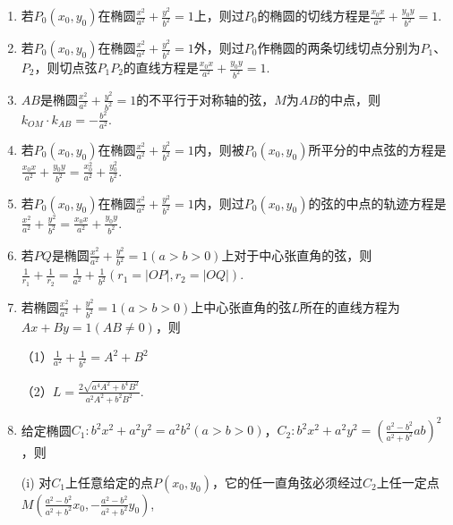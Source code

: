 \documentclass{article}
\begin{document}
\begin{enumerate}[label=\arabic*.]
\item 若$P_0\left(x_0,y_0\right)$在椭圆$\displaystyle\frac{x^2}{a^2} + \frac{y^2}{b^2} = 1$上，则过$P_0$的椭圆的切线方程是$\frac{x_0x}{a^2} + \frac{y_0y}{b^2} = 1$.

\item 若$P_0\left(x_0,y_0\right)$在椭圆$\displaystyle\frac{x^2}{a^2} + \frac{y^2}{b^2} = 1$外，则过$P_0$作椭圆的两条切线切点分别为$P_1$、$P_2$，则切点弦$P_1P_2$的直线方程是$\displaystyle\frac{x_0x}{a^2} + \frac{y_0y}{b^2} = 1$.

\item $AB$是椭圆$\displaystyle\frac{x^2}{a^2} + \frac{y^2}{b^2} = 1 $的不平行于对称轴的弦，$M$为$AB$的中点，则$k_{OM} \cdot k_{AB} = -\frac{b^2}{a^2}$. 

\item 若$P_0\left(x_0,y_0\right)$在椭圆$\displaystyle\frac{x^2}{a^2} + \frac{y^2}{b^2} = 1$内，则被$P_0\left(x_0,y_0\right)$所平分的中点弦的方程是$\frac{x_0x}{a^2} + \frac{y_0y}{b^2} = \frac{x_0^2}{a^2} + \frac{y_0^2}{b^2}$.

\item 若$P_0\left(x_0,y_0\right)$在椭圆$\displaystyle\frac{x^2}{a^2} + \frac{y^2}{b^2} = 1$内，则过$P_0\left(x_0,y_0\right)$的弦的中点的轨迹方程是$\frac{x^2}{a^2} + \frac{y^2}{b^2} = \frac{x_0x}{a^2} + \frac{y_0y}{b^2}$.

\item 若$PQ$是椭圆$\frac{x^2}{a^2} + \frac{y^2}{b^2} = 1 \left(a > b > 0\right)$上对于中心张直角的弦，则$\frac{1}{r_1} + \frac{1}{r_2} = \frac{1}{a^2} + \frac{1}{b^2}\left(r_1 = \left| OP \right|, r_2 = \left| OQ \right| \right)$. 

\item 若椭圆$\frac{x^2}{a^2} + \frac{y^2}{b^2} = 1 \left(a > b > 0\right)$上中心张直角的弦$L$所在的直线方程为$Ax+By=1\left(AB\neq0\right)$，则
\begin{multicols}{2} %
（1）$\frac{1}{a^2} + \frac{1}{b^2} = A^2 + B^2$

（2）$L=\frac{2\sqrt{a^4A^2+b^4B^2}}{a^2A^2+b^2B^2}$. 
\end{multicols}

\item 给定椭圆$C_1:b^2x^2+a^2y^2 = a^2b^2\left(a > b > 0\right)$，$C_2:b^2x^2+a^2y^2 = \left(\frac{a^2-b^2}{a^2+b^2}ab\right)^2$，则

\item[(i)] 对$C_1$上任意给定的点$P\left(x_0,y_0\right)$，它的任一直角弦必须经过$C_2$上任一定点$M\left(\frac{a^2-b^2}{a^2+b^2}x_0,-\frac{a^2-b^2}{a^2+b^2}y_0\right)$, 


\end{enumerate}
\end{document}
